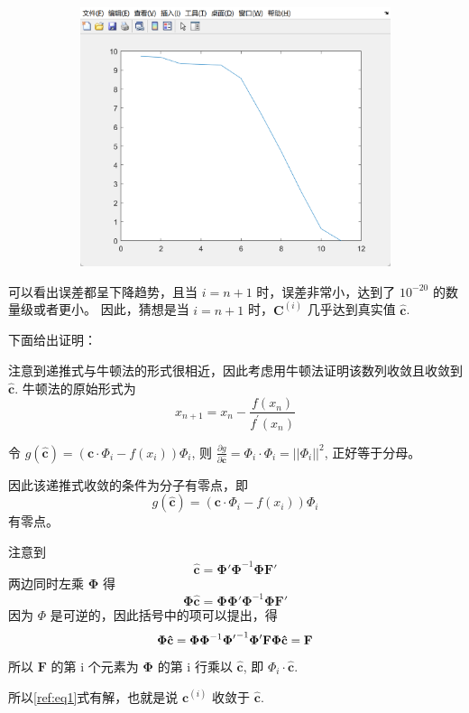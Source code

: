 \documentclass[11pt]{ctexart}
\begin{document}
\begin{figure}[H]
		\begin{subfigure}[t]{0.3\textwidth}
			\centering
			\includegraphics[width=\textwidth]{./picture/exp1_3_3}
		\end{subfigure}
	\end{figure}

	可以看出误差都呈下降趋势，且当 \(i=n+1\) 时，误差非常小，达到了 \(10^{-20}\) 的数量级或者更小。
	因此，猜想是当 \(i=n+1\) 时，\(\boldsymbol{C}^{(i)}\) 几乎达到真实值 \(\mathbf{\hat{c}}\).

	下面给出证明：

	注意到递推式与牛顿法的形式很相近，因此考虑用牛顿法证明该数列收敛且收敛到 \(\mathbf{\hat{c}}\).
	牛顿法的原始形式为
	\begin{equation}
		x_{n+1}=x_{n}-\frac{f\left(x_{n}\right)}{f^{\prime}\left(x_{n}\right)}
	\end{equation}

	\hspace{2em}
	令 \(g(\mathbf{\hat{c}})=(\mathbf{c}\cdot \Phi_i- f(x_i))\Phi_i\), 则
	\(\frac{\partial g}{\partial \mathbf{\hat c}} =\Phi_i \cdot \Phi_i=||\Phi_i||^2\), 正好等于分母。

	因此该递推式收敛的条件为分子有零点，即
	\begin{equation}
		g(\mathbf{\hat{c}})=(\mathbf{c}\cdot \Phi_i- f(x_i))\Phi_i \label{ref:eq1}
	\end{equation}
	有零点。

	注意到 \[\mathbf{\hat{c}}=\mathbf{\Phi'\Phi}^{-1}\mathbf{\Phi F'}\]
	两边同时左乘 \(\mathbf{\Phi}\) 得
	\[\mathbf{\Phi}\mathbf{\hat{c}}=\mathbf{\Phi}\mathbf{\Phi'\Phi}^{-1}\mathbf{\Phi F'}\]
	因为 \(\Phi\) 是可逆的，因此括号中的项可以提出，得
	\[\mathbf{\Phi}\mathbf{\hat{c}}=\mathbf{\Phi}\mathbf{\Phi}^{-1}\mathbf{\Phi'}^{-1}\mathbf{\Phi' F}\\
	\mathbf{\Phi}\mathbf{\hat{c}}=\mathbf{F}\]
	所以 \(\mathbf{F}\) 的第 i 个元素为 \(\mathbf{\Phi}\) 的第 i 行乘以 \(\mathbf{\hat{c}}\), 即 \(\Phi_i \cdot \mathbf{\hat{c}}\).

	所以\eqref{ref:eq1}式有解，也就是说 \(\mathbf{c}^{(i)}\) 收敛于 \(\mathbf{\hat{c}}\).
\end{document}
